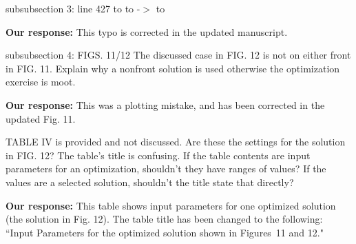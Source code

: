 \documentclass{article}
\begin{document}
subsubsection 3:
line 427 to to -$>$ to

{\bf Our response:} {\color{blue} This typo is corrected in the updated manuscript.}

subsubsection 4:
FIGS. 11/12 The discussed case in FIG. 12 is not on either front in
FIG. 11. Explain why a nonfront solution is used otherwise the
optimization exercise is moot.

{\bf Our response:} {\color{blue} This was a plotting mistake, and has been corrected in the updated Fig. 11.}

TABLE IV is provided and not discussed. Are these the settings for the
solution in FIG. 12? The table’s title is confusing. If the table
contents are input parameters for an optimization, shouldn’t they have
ranges of values? If the values are a selected solution, shouldn’t the
title state that directly?

{\bf Our response:} {\color{blue} This table shows input parameters for one optimized solution (the solution in Fig. 12). 
The table title has been changed to the following: ``Input Parameters for the optimized solution shown in Figures~11 and 12."}


 
\end{document}
